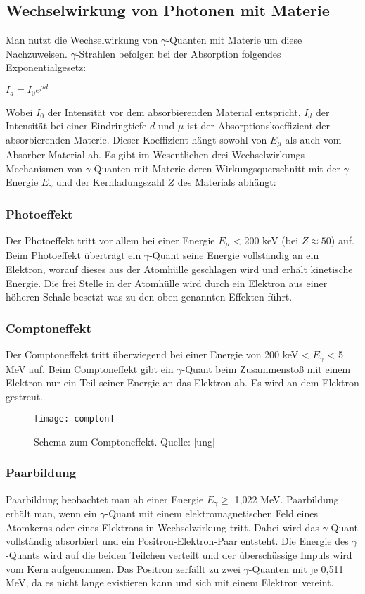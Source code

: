 \subsection{Wechselwirkung von Photonen mit Materie}
Man nutzt die Wechselwirkung von $\gamma$-Quanten mit Materie um diese Nachzuweisen. $\gamma$-Strahlen befolgen bei der Absorption folgendes Exponentialgesetz:
\begin{center}
$I_d=I_0e^{\mu d}$
\end{center}
Wobei $I_0$ der Intensität vor dem absorbierenden Material entspricht, $I_d$ der Intensität bei einer Eindringtiefe $d$ und $\mu$ ist der Absorptionskoeffizient der absorbierenden Materie. Dieser Koeffizient hängt sowohl von $E_{\mu}$ als auch vom Absorber-Material ab.
Es gibt im Wesentlichen drei Wechselwirkungs-Mechanismen von $\gamma$-Quanten mit Materie deren Wirkungsquerschnitt mit der $\gamma$-Energie $E_{\gamma}$ und der Kernladungszahl $Z$ des Materials abhängt:
\subsubsection{Photoeffekt}
Der Photoeffekt tritt vor allem bei einer Energie $E_{\mu}$ < 200 keV (bei $Z \approx 50$) auf. Beim Photoeffekt überträgt ein $\gamma$-Quant seine Energie vollständig an ein Elektron, worauf dieses aus der Atomhülle geschlagen wird und erhält kinetische Energie. Die frei Stelle in der Atomhülle wird durch ein Elektron aus einer höheren Schale besetzt was zu den oben genannten Effekten führt.
\subsubsection{Comptoneffekt}
Der Comptoneffekt tritt überwiegend bei einer Energie von 200 keV < $E_{\gamma}$ < 5 MeV auf. Beim Comptoneffekt gibt ein $\gamma$-Quant beim Zusammenstoß mit einem Elektron nur ein Teil seiner Energie an das Elektron ab. Es wird an dem Elektron gestreut.

\begin{figure}[h]
\begin{center}
\texttt{[image: compton]}
\caption{Schema zum Comptoneffekt. Quelle: [ung]}
\label{fig:graph1}
\end{center}
\end{figure}

\subsubsection{Paarbildung}
Paarbildung beobachtet man ab einer Energie $E_{\gamma} \ge$ 1,022 MeV. Paarbildung erhält man, wenn ein $\gamma$-Quant mit einem elektromagnetischen Feld eines Atomkerns oder eines Elektrons in Wechselwirkung tritt. Dabei wird das $\gamma$-Quant vollständig absorbiert und ein Positron-Elektron-Paar entsteht. Die Energie des $\gamma$-Quants wird auf die beiden Teilchen verteilt und der überschüssige Impuls wird vom Kern aufgenommen. Das Positron zerfällt zu zwei $\gamma$-Quanten mit je 0,511 MeV, da es nicht lange existieren kann und sich mit einem Elektron vereint.
